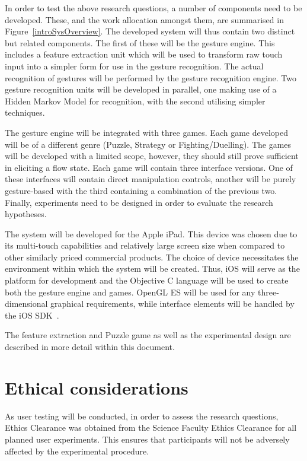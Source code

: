 In order to test the above research questions, a number of components need to be developed. These, and the work allocation amongst them, are summarised in Figure~\ref{introSysOverview}. The developed system will thus contain two distinct but related components. The first of these will be the gesture engine. This includes a feature extraction unit which will be used to transform raw touch input into a simpler form for use in the gesture recognition. The actual recognition of gestures will be performed by the gesture recognition engine. Two gesture recognition units will be developed in parallel, one making use of a Hidden Markov Model for recognition, with the second utilising simpler techniques.

The gesture engine will be integrated with three games. Each game developed will be of a different genre (Puzzle, Strategy or Fighting/Duelling). The games will be developed with a limited scope, however, they should still prove sufficient in eliciting a flow state. Each game will contain three interface versions. One of these interfaces will contain direct manipulation controls, another will be purely gesture-based with the third containing a combination of the previous two. Finally, experiments need to be designed in order to evaluate the research hypotheses. 

The system will be developed for the Apple iPad. This device was chosen due to its multi-touch capabilities and relatively large screen size when compared to other similarly priced commercial products. The choice of device necessitates the environment within which the system will be created. Thus, iOS will serve as the platform for development and the Objective C language will be used to create both the gesture engine and games. OpenGL ES will be used for any three-dimensional graphical requirements, while interface elements will be handled by the iOS SDK~\citep{A10a}.

The feature extraction and Puzzle game as well as the experimental design are described in more detail within this document.

\section{Ethical considerations}
As user testing will be conducted, in order to assess the research questions, Ethics Clearance was obtained from the Science Faculty Ethics Clearance for all planned user experiments. This ensures that participants will not be adversely affected by the experimental procedure.

